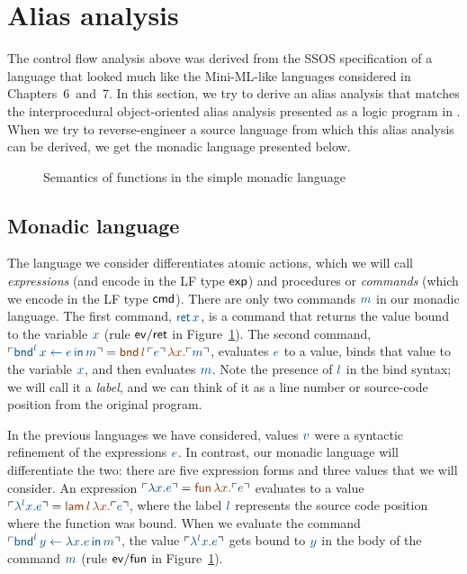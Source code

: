 \section{Alias analysis}
\label{sec:aliasanalysis}

The control flow analysis above was derived from the SSOS
specification of a language that looked much like the Mini-ML-like
languages considered in Chapters~6~and~7.  In this section, we try to
derive an alias analysis that matches the interprocedural
object-oriented alias analysis presented as a logic program in
\cite[Chapter 12.4]{aho07compilers}.  When we try to reverse-engineer
a source language from which this alias analysis can be derived, we
get the monadic language presented below.

\begin{figure}
\caption{Semantics of functions in the simple monadic language}
\label{fig:ssos-monadic}
\end{figure}

\subsection{Monadic language}

The language we consider differentiates atomic actions, which we will
call {\it expressions} (and encode in the LF type ${\sf exp}$) and
procedures or {\it commands} (which we encode in the LF type ${\sf
  cmd}$). There are only two commands $\obj{m}$ in our monadic language. The
first command, $\obj{{\sf ret}\,x}$, is a command that returns the value
bound to the variable $\obj{x}$ (rule ${\sf ev/ret}$ in
Figure~\ref{fig:ssos-monadic}). The second command, $\interp{{\sf
    bnd}^l\, x \leftarrow e \,{\sf in}\,m} = \lf{{\sf
  bnd}\,l\,\interp{e}\,\lambda x.\interp{m}}$, evaluates $\obj{e}$ to a
value, binds that value to the variable $\obj{x}$, and then evaluates
$\obj{m}$. Note the presence of $\obj{l}$ 
in the bind syntax; we will call it a
{\it label}, and we can think of it as a line number or source-code
position from the original program.

In the previous languages we have considered, values $\obj{v}$ were a
syntactic refinement of the expressions $\obj{e}$. In contrast, our monadic
language will differentiate the two: there are five expression forms
and three values that we will consider. An expression $\interp{\lambda
  x.e} = \lf{{\sf fun}\,\lambda x.\interp{e}}$ evaluates to a value
$\interp{\lambda^l x.e} = \lf{{\sf lam}\,l\,\lambda x.\interp{e}}$, where
the label $\obj{l}$ represents the source code position where the function
was bound. When we evaluate the command $\interp{{\sf
    bnd}^l \, y \leftarrow \lambda x.e \,{\sf in}\,m}$, the value
$\interp{\lambda^l x.e}$ gets bound to $\obj{y}$ in the body of the command
$\obj{m}$ (rule ${\sf ev/fun}$ in Figure~\ref{fig:ssos-monadic}).

